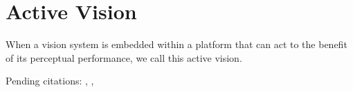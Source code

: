 \section{Active Vision}

When a vision system is embedded within a platform that can act to
the benefit of its perceptual performance, we call this active vision.

Pending citations: \cite{tarr94computational},
\cite{tsikos91segmentation},
\cite{bajcsy88active}
\cite{aloimonos87active}
\cite{ballard91animate}
